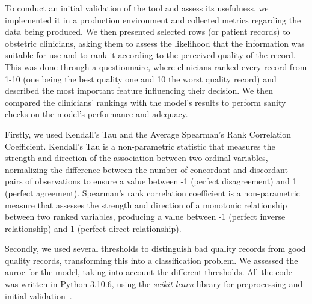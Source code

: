 To conduct an initial validation of the tool and assess its usefulness, we implemented it in a production environment and collected metrics regarding the data being produced. We then presented selected rows (or patient records) to obstetric clinicians, asking them to assess the likelihood that the information was suitable for use and to rank it according to the perceived quality of the record. This was done through a questionnaire, where clinicians ranked every record from 1-10 (one being the best quality one and 10 the worst quality record) and described the most important feature influencing their decision. We then compared the clinicians' rankings with the model's results to perform sanity checks on the model's performance and adequacy.

Firstly, we used Kendall's Tau and the Average Spearman's Rank Correlation Coefficient. Kendall's Tau is a non-parametric statistic that measures the strength and direction of the association between two ordinal variables, normalizing the difference between the number of concordant and discordant pairs of observations to ensure a value between -1 (perfect disagreement) and 1 (perfect agreement). Spearman's rank correlation coefficient is a non-parametric measure that assesses the strength and direction of a monotonic relationship between two ranked variables, producing a value between -1 (perfect inverse relationship) and 1 (perfect direct relationship).
    
Secondly, we used several thresholds to distinguish bad quality records from good quality records, transforming this into a classification problem. We assessed the \ac{auroc} for the model, taking into account the different thresholds. All the code was written in Python 3.10.6, using the \textit{scikit-learn} library for preprocessing and initial validation~\cite{scikit-learn}.
    